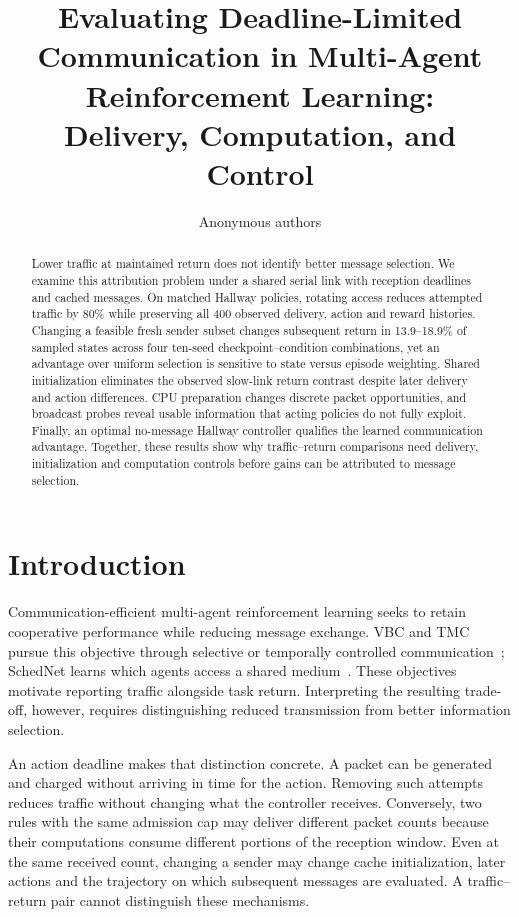 \documentclass[10pt]{article}
\title{Evaluating Deadline-Limited Communication in Multi-Agent Reinforcement Learning:\\Delivery, Computation, and Control}
\author{\name Anonymous authors}
\begin{document}
\maketitle

\begin{abstract}
Lower traffic at maintained return does not identify better message selection. We examine this attribution problem under a shared serial link with reception deadlines and cached messages. On matched Hallway policies, rotating access reduces attempted traffic by 80\% while preserving all 400 observed delivery, action and reward histories. Changing a feasible fresh sender subset changes subsequent return in 13.9--18.9\% of sampled states across four ten-seed checkpoint--condition combinations, yet an advantage over uniform selection is sensitive to state versus episode weighting. Shared initialization eliminates the observed slow-link return contrast despite later delivery and action differences. CPU preparation changes discrete packet opportunities, and broadcast probes reveal usable information that acting policies do not fully exploit. Finally, an optimal no-message Hallway controller qualifies the learned communication advantage. Together, these results show why traffic--return comparisons need delivery, initialization and computation controls before gains can be attributed to message selection.
\end{abstract}


\section{Introduction}
Communication-efficient multi-agent reinforcement learning seeks to retain cooperative performance while reducing message exchange. VBC and TMC pursue this objective through selective or temporally controlled communication~\citep{zhang2019efficient,zhang2020succinct}; SchedNet learns which agents access a shared medium~\citep{kim2019schedule}. These objectives motivate reporting traffic alongside task return. Interpreting the resulting trade-off, however, requires distinguishing reduced transmission from better information selection.

An action deadline makes that distinction concrete. A packet can be generated and charged without arriving in time for the action. Removing such attempts reduces traffic without changing what the controller receives. Conversely, two rules with the same admission cap may deliver different packet counts because their computations consume different portions of the reception window. Even at the same received count, changing a sender may change cache initialization, later actions and the trajectory on which subsequent messages are evaluated. A traffic--return pair cannot distinguish these mechanisms.
\end{document}
